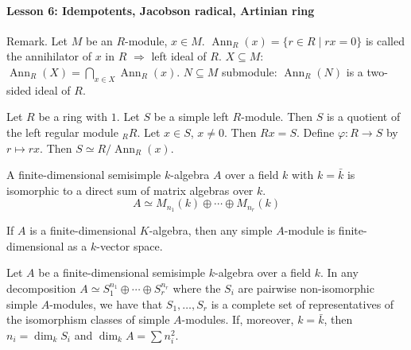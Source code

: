 \documentclass[11pt, a4paper]{report}
\begin{document}
\paragraph{Lesson 6: Idempotents, Jacobson radical, Artinian ring}

Remark. Let $M$ be an $R$-module, $x \in M$. $\operatorname{Ann}_R(x) = \{r \in R \mid rx = 0\}$ is called the annihilator of $x$ in $R$ $\Rightarrow$ left ideal of $R$. $X \subseteq M$: $\operatorname{Ann}_R(X) = \bigcap_{x \in X} \operatorname{Ann}_R(x)$. $N \subseteq M$ submodule: $\operatorname{Ann}_R(N)$ is a two-sided ideal of $R$.

\begin{lemma}
Let $R$ be a ring with $1$. Let $S$ be a simple left $R$-module. Then $S$ is a quotient of the left regular module ${}_R R$. Let $x \in S$, $x \neq 0$. Then $Rx = S$.
Define $\varphi: R \rightarrow S$ by $r \mapsto rx$. Then $S \simeq R/\operatorname{Ann}_R(x)$.

\end{lemma}

\begin{theorem}
A finite-dimensional semisimple $k$-algebra $A$ over a field $k$ with $k=\bar{k}$ is isomorphic to a direct sum of matrix algebras over $k$.
\[
A \simeq M_{n_1}(k) \oplus \cdots \oplus M_{n_r}(k)
\]
\end{theorem}

\begin{corollary}
If $A$ is a finite-dimensional $K$-algebra, then any simple $A$-module is finite-dimensional as a $k$-vector space.
\end{corollary}

\begin{proposition}

\end{proposition}

\begin{proposition}
Let $A$ be a finite-dimensional semisimple $k$-algebra over a field $k$. In any decomposition $A \simeq S_{1}^{n_{1}} \oplus \cdots \oplus S_{r}^{n_{r}}$ where the $S_i$ are pairwise non-isomorphic simple $A$-modules, we have that $S_{1}, \ldots, S_{r}$ is a complete set of representatives of the isomorphism classes of simple $A$-modules. If, moreover, $k=\bar{k}$, then $n_{i}=\operatorname{dim}_{k} S_{i}$ and $\operatorname{dim}_{k} A=\sum n_{i}^{2}$.
\end{proposition}
\end{document}
